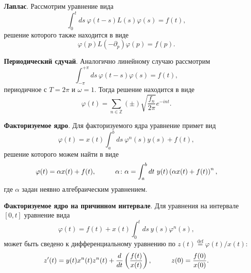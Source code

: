\textbf{Лаплас}. Рассмотрим уравнение вида
\begin{equation*}
	\int_{0}^{t} ds\ \varphi(t-s) L(s) \varphi(s) = f(t),
\end{equation*}
решение которого также находится в виде
\begin{equation*}
	\varphi(p) L(-\partial_p) \varphi(p) = f(p).
\end{equation*}


\textbf{Периодический сдучай}. Аналогично линейному случаю рассмотрим
\begin{equation*}
	\int_{-\pi}^{+\pi} ds\ \varphi(t-s) \varphi(s) = f(t),
\end{equation*}
периодичное с $T=2\pi$ и $\omega = 1$. Тогда решение находится в виде
\begin{equation*}
	\varphi(t) = \sum_{n \in \mathbb{Z}} (\pm) \sqrt{\frac{f_n}{2\pi}} e^{-int}.
\end{equation*}


\textbf{Факторизуемое ядро}. Для факторизуемого ядра уравнение примет вид
\begin{equation*}
	\varphi(t) =  x(t)\int_{a}^{b} ds\ \varphi^n (s) y(s) + f(t),
\end{equation*}
решение которого можем найти в виде
\begin{equation*}
	\varphi(t) = \alpha x(t) + f(t),
	\hspace{10 mm} 
	\alpha \colon  \alpha = \int_{a}^{b} dt\ y(t) \left(
		\alpha x(t) + f(t)
	\right)^n,
\end{equation*}
где $\alpha$ задан неявно алгебраическим уравнением.

\textbf{Факторизуемое ядро на причинном интервале}. Для уравнения на интервале $[0, t]$ уравнение вида
\begin{equation*}
	\varphi(t) = f(t) + x(t) \int_{0}^{t} ds\ y(s) \varphi^n (s),
\end{equation*}
может быть сведено к дифференциальному уравнению по $z(t) \overset{\mathrm{def}}{=} \varphi(t) / x(t)$:
\begin{equation*}
	z'(t) = y(t) x^n (t) z^n (t) + \frac{d }{d t} \left(\frac{f(t)}{x(t)}\right),
	\hspace{10 mm} 
	z(0) = \frac{f(0)}{x(0)}.
\end{equation*}



